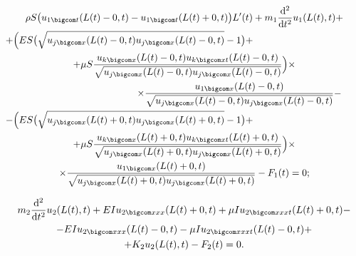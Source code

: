 \begin{multline}\label{Anisimov_eq33}

\rho S

\bigl(u_{1 \bigcom t}(L(t)-0, t)-u_{1 \bigcom t}(L(t)+0, t)\bigr)L'(t)+ 

m_1\frac{\mathrm{d}^2 }{\mathrm{d}t^2} u_1( L(t), t ) +\\

+\Bigl(

ES\bigl(\sqrt{u_{j \bigcom x}(L(t)-0, t)u_{j \bigcom x}(L(t)-0, t)}-1\bigr)+ \hspace{4cm} \\

+ \mu S\frac{u_{k \bigcom x}(L(t)-0, t)u_{k \bigcom xt}(L(t)-0, t)} {\sqrt{u_{j \bigcom x}(L(t)-0, t)u_{j \bigcom x}(L(t)-0, t)}}\Bigr) \times

\\

\hspace{4cm}

\times 

\frac{u_{1 \bigcom x}(L(t)-0, t)} {\sqrt{u_{j \bigcom x}(L(t)-0, t)u_{j \bigcom x}(L(t)-0, t)}}-\\

-\Bigl(ES\bigl(\sqrt{u_{j \bigcom x}(L(t)+0, t)u_{j \bigcom x}(L(t)+0, t)}-1\bigr)+ \hspace{4cm} \\

+ \mu S\frac{u_{k \bigcom x}(L(t)+0, t)u_{k \bigcom xt}(L(t)+0, t)} {\sqrt{u_{j \bigcom x}(L(t)+0, t)u_{j \bigcom x}(L(t)+0, t)}}\Bigr)

\times 

\\

\times 

\frac{u_{1 \bigcom x}(L(t)+0, t)} {\sqrt{u_{j \bigcom x}(L(t)+0, t)u_{j \bigcom x}(L(t)+0, t)}}-F_1(t)=0;

\end{multline}

\begin{multline}\label{Anisimov_eq34}

m_2\frac{\mathrm{d}^2}{\mathrm{d}t^2} u_2( L(t), t ) +EIu_{2 \bigcom xxx}(L(t)+0, t)+ \mu Iu_{2 \bigcom xxxt}(L(t)+0, t)-\\

-EIu_{2 \bigcom xxx} (L(t)- 0, t )-\mu Iu_{2 \bigcom xxxt}(L(t)-0, t)+ \\ +  K_2u_2( L(t), t )-F_2(t)=0.

\end{multline}



